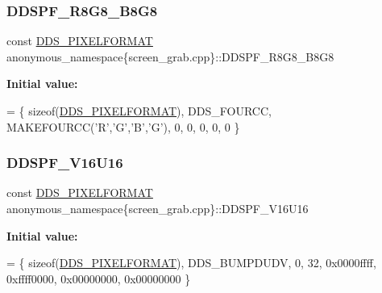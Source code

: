 \subsubsection{\texorpdfstring{D\+D\+S\+P\+F\+\_\+\+R8\+G8\+\_\+\+B8\+G8}{DDSPF\_R8G8\_B8G8}}
{\footnotesize\ttfamily const \mbox{\hyperlink{structanonymous__namespace_02screen__grab_8cpp_03_1_1_d_d_s___p_i_x_e_l_f_o_r_m_a_t}{D\+D\+S\+\_\+\+P\+I\+X\+E\+L\+F\+O\+R\+M\+AT}} anonymous\+\_\+namespace\{screen\+\_\+grab.\+cpp\}\+::D\+D\+S\+P\+F\+\_\+\+R8\+G8\+\_\+\+B8\+G8}

{\bfseries Initial value\+:}
\begin{DoxyCode}
=
        \{ \textcolor{keyword}{sizeof}(\mbox{\hyperlink{struct_d_d_s___p_i_x_e_l_f_o_r_m_a_t}{DDS\_PIXELFORMAT}}), DDS\_FOURCC, MAKEFOURCC(\textcolor{charliteral}{'R'},\textcolor{charliteral}{'G'},\textcolor{charliteral}{'B'},\textcolor{charliteral}{'G'}), 0, 0, 0, 0, 0 \}
\end{DoxyCode}
\mbox{\label{namespaceanonymous__namespace_02screen__grab_8cpp_03_ad2007e8590c94da31c60d443d6b94c60}} 
\subsubsection{\texorpdfstring{D\+D\+S\+P\+F\+\_\+\+V16\+U16}{DDSPF\_V16U16}}
{\footnotesize\ttfamily const \mbox{\hyperlink{structanonymous__namespace_02screen__grab_8cpp_03_1_1_d_d_s___p_i_x_e_l_f_o_r_m_a_t}{D\+D\+S\+\_\+\+P\+I\+X\+E\+L\+F\+O\+R\+M\+AT}} anonymous\+\_\+namespace\{screen\+\_\+grab.\+cpp\}\+::D\+D\+S\+P\+F\+\_\+\+V16\+U16}

{\bfseries Initial value\+:}
\begin{DoxyCode}
= 
        \{ \textcolor{keyword}{sizeof}(\mbox{\hyperlink{struct_d_d_s___p_i_x_e_l_f_o_r_m_a_t}{DDS\_PIXELFORMAT}}), DDS\_BUMPDUDV, 0, 32, 0x0000ffff, 0xffff0000, 0x00000000, 
      0x00000000 \}
\end{DoxyCode}
\mbox{\label{namespaceanonymous__namespace_02screen__grab_8cpp_03_aaaf25ab9032188d6dd6e3f124aa7f169}} 
